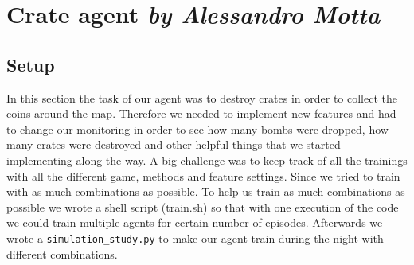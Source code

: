 \section[Crate agent]{Crate agent  \hfill \small \normalfont\textit{by Alessandro Motta}}
\subsection{Setup}
In this section the task of our agent was to destroy crates in order to collect the coins around the map. Therefore we needed to implement new features and had to change our monitoring in order to see how many bombs were dropped, how many crates were destroyed and other helpful things that we started implementing along the way. A big challenge was to keep track of all the trainings with all the different game, methods and feature settings. Since we tried to train with as much combinations as possible. To help us train as much combinations as possible we wrote a shell script (train.sh) so that with one execution of the code we could train multiple agents for certain number of episodes. Afterwards we wrote a \texttt{simulation\_study.py} to make our agent train during the night with different combinations.

